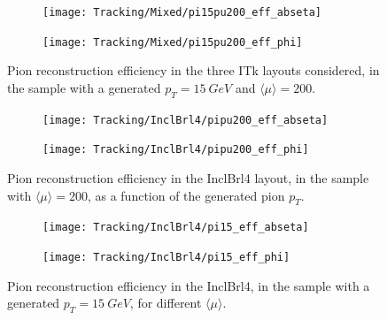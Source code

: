 \documentclass[a4paper,twoside,12pt]{book}
\begin{document}
\begin{figure}
\begin{subfigure}{.5\linewidth}
\centering
\texttt{[image: Tracking/Mixed/pi15pu200\_eff\_abseta]}
\caption{} 
\label{fig:tracking:pi15pu200_eff_abseta}
\end{subfigure}
\begin{subfigure}{.5\linewidth}
\centering
\texttt{[image: Tracking/Mixed/pi15pu200\_eff\_phi]}
\caption{} 
\label{fig:tracking:pi15pu200_eff_phi}
\end{subfigure}
\caption{Pion reconstruction efficiency in the three ITk layouts considered, in the sample with a generated $p_{T} = 15\ GeV$ and $\langle\mu\rangle = 200$.}
\label{fig:tracking:effLayout}
\end{figure}

\begin{figure}
\begin{subfigure}{.5\linewidth}
\centering
\texttt{[image: Tracking/InclBrl4/pipu200\_eff\_abseta]}
\caption{} 
\label{fig:tracking:pipu200_eff_abseta}
\end{subfigure}
\begin{subfigure}{.5\linewidth}
\centering
\texttt{[image: Tracking/InclBrl4/pipu200\_eff\_phi]}
\caption{} 
\label{fig:tracking:pipu200_eff_phi}
\end{subfigure}
\caption{Pion reconstruction efficiency in the InclBrl4 layout, in the sample with $\langle\mu\rangle = 200$, as a function of the generated pion $p_{T}$.}
\label{fig:tracking:effPt}
\end{figure}

\begin{figure}
\begin{subfigure}{.5\linewidth}
\centering
\texttt{[image: Tracking/InclBrl4/pi15\_eff\_abseta]}
\caption{} 
\label{fig:tracking:pi15_eff_abseta}
\end{subfigure}
\begin{subfigure}{.5\linewidth}
\centering
\texttt{[image: Tracking/InclBrl4/pi15\_eff\_phi]}
\caption{} 
\label{fig:tracking:pi15_eff_phi}
\end{subfigure}
\caption{Pion reconstruction efficiency in the InclBrl4, in the sample with a generated $p_{T} = 15\ GeV$, for different $\langle\mu\rangle$.}
\label{fig:tracking:effPileup}
\end{figure}
\end{document}
